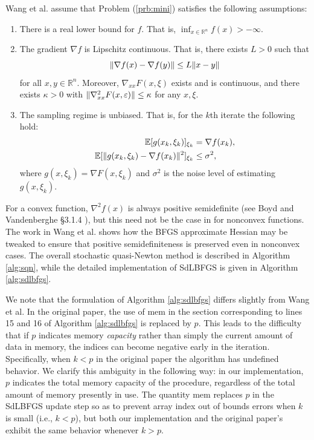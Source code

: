 \documentclass{article}
\newcommand{\RR}{\mathbb{R}}
\DeclarePairedDelimiter{\norm}{\|}{\|}
\DeclarePairedDelimiter{\ex}{\mathbb{E}[}{]}
\begin{document}
Wang et al. \cite{sdlbfgs} assume that Problem (\ref{prb:mini}) satisfies the
following assumptions:
\begin{enumerate}
  \item There is a real lower bound for $f$. That is, $\inf_{x \in \RR^n} f(x) >
    -\infty$.
  \item The gradient $\nabla f$ is Lipschitz continuous. That is, there exists
    $L > 0$ such that 
    \begin{equation*}
      \norm{\nabla f(x) - \nabla f(y)} \leq L \norm{x - y}
    \end{equation*}
    for all $x,y \in \RR^n$. Moreover, $\nabla_{xx} F(x, \xi)$ exists and is
    continuous, and there exists $\kappa > 0$ with $\norm{\nabla^2_{xx} F(x,
    \varepsilon)} \leq \kappa$ for any $x, \xi$.
  \item The sampling regime is unbiased. That is, for the $k$th iterate the
    following hold:
    \begin{align*}
      \ex{g(x_k, \xi_k)}_{\xi_k} &= \nabla f(x_k), \\
      \ex{\norm{g(x_k, \xi_k) - \nabla f(x_k)}^2}_{\xi_k} &\leq \sigma^2,
    \end{align*}
    where $g(x, \xi_k) = \nabla F(x, \xi_k)$ and $\sigma^2$ is the noise level
    of estimating $g(x, \xi_k)$. 
\end{enumerate}

For a convex function, $\nabla^2 f(x)$ is always positive semidefinite (see Boyd
and Vandenberghe \S 3.1.4 \cite{boyd}), but this need not be the case in for
nonconvex functions. The work in Wang et al.  \cite{sdlbfgs} shows how the BFGS
approximate Hessian may be tweaked to ensure that positive semidefiniteness is
preserved even in nonconvex cases. The overall stochastic quasi-Newton method is
described in Algorithm \ref{alg:sqn}, while the detailed implementation of
SdLBFGS is given in Algorithm \ref{alg:sdlbfgs}.

We note that the formulation of Algorithm \ref{alg:sdlbfgs} differs slightly
from Wang et al. In the original paper, the use of $\textrm{mem}$ in the section
corresponding to lines 15 and 16 of Algorithm \ref{alg:sdlbfgs} is replaced by
$p$. This leads to the difficulty that if $p$ indicates memory \emph{capacity}
rather than simply the current amount of data in memory, the indices can become
negative early in the iteration. Specifically, when $k < p$ in the original
paper the algorithm has undefined behavior. We clarify this ambiguity in the
following way: in our implementation, $p$ indicates the total memory capacity of
the procedure, regardless of the total amount of memory presently in use. The
quantity $\textrm{mem}$ replaces $p$ in the SdLBFGS update step so as to prevent
array index out of bounds errors when $k$ is small (i.e., $k < p$), but both our
implementation and the original paper's exhibit the same behavior whenever $k >
p$.
\end{document}
